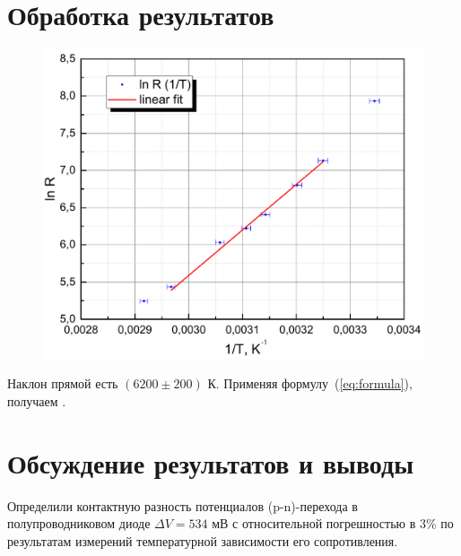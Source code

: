 \documentclass[a4paper,12pt]{article} %
\begin{document}
	\section{Обработка результатов}
		\begin{figure}[h!]
			\begin{floatrow}
				{\includegraphics[scale=0.7]{graph.pdf}}    
			\end{floatrow}
		\end{figure}
		Наклон прямой есть $(6200 \pm 200)$ К. Применяя формулу~(\ref{eq:formula}), получаем
		.

\section{Обсуждение результатов и выводы}
	Определили контактную разность потенциалов (p-n)-перехода в полупроводниковом диоде $\Delta V = 534$ мВ с относительной погрешностью в 3\% по результатам измерений температурной зависимости его сопротивления.
\end{document}

